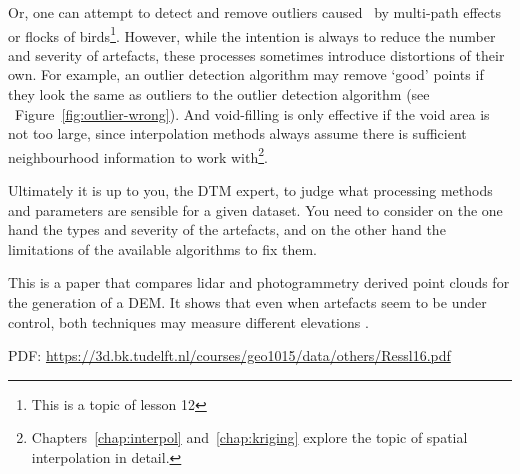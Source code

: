 Or, one can attempt to detect and remove outliers caused \eg\  by multi-path effects or flocks of birds\footnote{This is a topic of lesson 12}. 
However, while the intention is always to reduce the number and severity of artefacts, these processes sometimes introduce distortions of their own.
For example, an outlier detection algorithm may remove `good' points if they look the same as outliers to the outlier detection algorithm (see \eg\ Figure~\ref{fig:outlier-wrong}).
And void-filling is only effective if the void area is not too large, since interpolation methods always assume there is sufficient neighbourhood information to work with\footnote{Chapters~\ref{chap:interpol} and~\ref{chap:kriging} explore the topic of spatial interpolation in detail.}.

Ultimately it is up to you, the DTM expert, to judge what processing methods and parameters are sensible for a given dataset.
You need to consider on the one hand the types and severity of the artefacts, and on the other hand the limitations of the available algorithms to fix them. 

\begin{link-box}
This is a paper that compares lidar and photogrammetry derived point clouds for the generation of a DEM\@. It shows that even when artefacts seem to be under control, both techniques may measure different elevations \citep{Ressl16}. 

PDF: \url{https://3d.bk.tudelft.nl/courses/geo1015/data/others/Ressl16.pdf}
\end{link-box}





